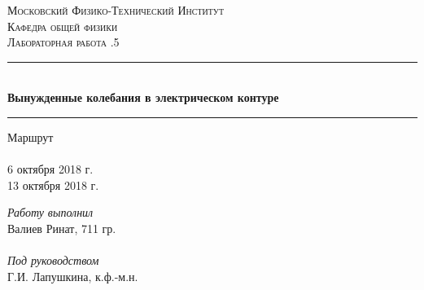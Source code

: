 \begin{titlepage}


\pagestyle{empty}	%

\begin{center}
	\textsc{\LARGE Московский Физико-Технический Институт}\\[1,5cm]
	\textsc{\Large Кафедра общей физики}\\[0,5cm]
	\textsc{\large Лабораторная работа .5}\\[2.5cm]

	\noindent\rule{\textwidth}{1pt}
	\\[0.5cm]
	{ \huge \bfseries Вынужденные колебания в электрическом контуре}
	\\[0.1cm]
	\noindent\rule{\textwidth}{1pt}
\end{center}

\vfill

\begin{minipage}[b]{0.3\textwidth}
	Маршрут \\\\
	6 октября 2018 г.\\
	13 октября 2018 г.
\end{minipage}
\hfill
\begin{minipage}[b]{0.33\textwidth}
	\textit{Работу выполнил}\\
	Валиев Ринат, 711 гр.\\\\
	\textit{Под руководством}\\
	Г.И. Лапушкина, к.ф.-м.н.
\end{minipage}


\end{titlepage}

\pagestyle{plain}		%
\setcounter{page}{2}	%